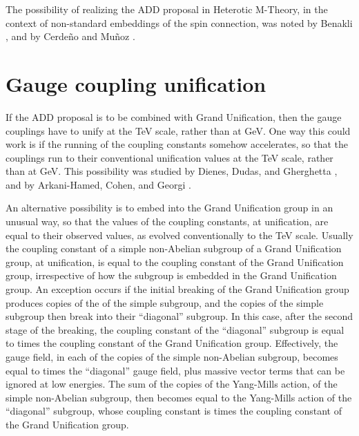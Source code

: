 \documentclass[a4paper,12pt,oneside]{article}
\begin{document}
The possibility of realizing the ADD proposal in Heterotic M-Theory,
in the context of non-standard embeddings of the spin connection,
was noted by Benakli \cite{Benakli}, and by Cerde\~no and Mu\~noz
\cite{CM}.

\section{Gauge coupling unification}

If the ADD proposal is to be combined with Grand Unification, then
the gauge couplings have to unify at the TeV scale, rather than at
\coordHE{} GeV.  One way this could work is if the running of the
coupling constants somehow accelerates, so that the couplings run to
their conventional unification values at the TeV scale, rather than 
at
\coordHE{} GeV.  This possibility was studied by Dienes, Dudas, and
Gherghetta \cite{DDG1, DDG2}, and by Arkani-Hamed, Cohen, and Georgi
\cite{ACG}.

An alternative possibility is to embed \coordHE{} into the Grand Unification group
in an unusual way, so that the values of the coupling constants, at 
unification, are equal to their observed values, as evolved 
conventionally to the TeV scale.  Usually the coupling constant of
a simple non-Abelian subgroup of a Grand Unification group, at
unification, is equal to the coupling constant of the Grand
Unification group, irrespective of how the subgroup is embedded
in the Grand Unification group.  An exception occurs \cite{Benakli, 
ACG} if 
the initial breaking of the Grand Unification group produces \coordHE{} 
copies of the of the simple subgroup, and the \coordHE{} copies of the 
simple subgroup then break into their ``diagonal'' subgroup.  In 
this case, after the second stage of the breaking, the coupling 
constant of the ``diagonal'' subgroup is equal to 
\coordHE{} times the coupling constant of the Grand
Unification group.  Effectively, the gauge field, in each of the
\coordHE{} copies of the simple non-Abelian subgroup, becomes equal to
\coordHE{} times the ``diagonal'' gauge field, plus 
massive vector terms that can be ignored at low energies.  The sum
of the \coordHE{} copies of the Yang-Mills action, of the simple 
non-Abelian subgroup, then becomes equal to the Yang-Mills action of
the ``diagonal'' subgroup, whose coupling constant is 
\coordHE{} times the coupling constant of the Grand
Unification group.
\end{document}
